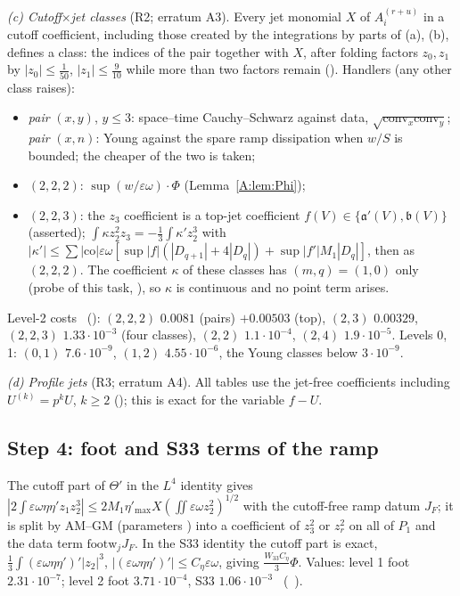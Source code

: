 \documentclass[11pt]{article}
\begin{document}
\emph{(c) Cutoff$\times$jet classes} (R2; erratum A3). Every jet monomial $X$ of $A_i^{(r+u)}$ in a cutoff coefficient, including those created by the integrations by parts of (a), (b), defines a class: the indices of the pair together with $X$, after folding factors $z_0,z_1$ by $|z_0|\le\frac1{50}$, $|z_1|\le\frac9{10}$ while more than two factors remain (). Handlers (any other class raises):
\begin{itemize}[leftmargin=*]
\item \emph{pair} $(x,y)$, $y\le3$: space--time Cauchy--Schwarz against data, $\sqrt{\mathrm{conv}_x\mathrm{conv}_y}$; \emph{pair} $(x,n)$: Young against the spare ramp dissipation when $w/S$ is bounded; the cheaper of the two is taken;
\item \emph{$(2,2,2)$}: $\sup(w/\varepsilon\omega)\cdot\Phi$ (Lemma~\ref{A:lem:Phi});
\item \emph{$(2,2,3)$}: the $z_3$ coefficient is a top-jet coefficient $f(V)\in\{\mathfrak a'(V),\mathfrak b(V)\}$ (asserted); $\int\kappa z_2^2z_3=-\frac13\int\kappa'z_2^3$ with $|\kappa'|\le\sum|\mathrm{co}|\varepsilon\omega[\sup|f|(|D_{q+1}|+4|D_q|)+\sup|f'|M_1|D_q|]$, then as $(2,2,2)$. The coefficient $\kappa$ of these classes has $(m,q)=(1,0)$ only (probe of this task, ), so $\kappa$ is continuous and no point term arises.
\end{itemize}
Level-2 costs \tC\ (): $(2,2,2)$ $0.0081$ (pairs) $+0.00503$ (top), $(2,3)$ $0.00329$, $(2,2,3)$ $1.33\cdot10^{-3}$ (four classes), $(2,2)$ $1.1\cdot10^{-4}$, $(2,4)$ $1.9\cdot10^{-5}$. Levels 0, 1: $(0,1)$ $7.6\cdot10^{-9}$, $(1,2)$ $4.55\cdot10^{-6}$, the Young classes below $3\cdot10^{-9}$.

\emph{(d) Profile jets} (R3; erratum A4). All tables use the jet-free coefficients including $U^{(k)}=p^kU$, $k\ge2$ (); this is exact for the variable $f-U$.

\subsection{Step 4: foot and S33 terms of the ramp}\label{A:sec:foot}
The cutoff part of $\Theta'$ in the $L^4$ identity gives $|2\int\varepsilon\omega\eta\eta'z_1z_2^3|\le2M_1\eta'_{\max}X(\iint\varepsilon\omega z_2^2)^{1/2}$ with the cutoff-free ramp datum $J_F$; it is split by AM--GM (parameters ) into a coefficient of $z_3^2$ or $z_r^2$ on all of $P_1$ and the data term $\mathrm{footw}_jJ_F$. In the S33 identity the cutoff part is exact, $\frac13\int(\varepsilon\omega\eta\eta')'|z_2|^3$, $|(\varepsilon\omega\eta\eta')'|\le C_\eta\varepsilon\omega$, giving $\frac{W_{33}C_\eta}3\Phi$. Values: level 1 foot $2.31\cdot10^{-7}$; level 2 foot $3.71\cdot10^{-4}$, S33 $1.06\cdot10^{-3}$ \tC\ (\SA\ ).
\end{document}
